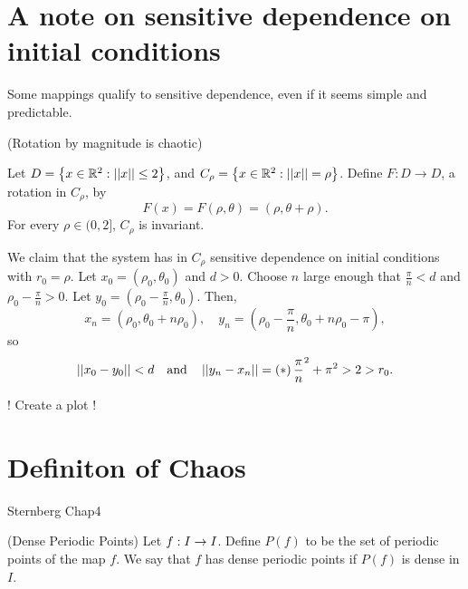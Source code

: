 \documentclass[12pt]{book}
\begin{document}
\section{A note on sensitive dependence on initial conditions}
Some mappings qualify to sensitive dependence, even if it seems simple and predictable.

\begin{proposition}
  (Rotation by magnitude is chaotic)

  Let $D = \left \{ x \in \mathbb{R}^2: \left|\left| x \right|\right| \leq 2 \right \}$, and $C_\rho = \left \{ x \in \mathbb{R}^2: \left|\left| x \right|\right| = \rho \right \}$.
  Define $F: D \to D$, a rotation in $C_\rho$, by
  \begin{equation*}
    F(x) = F(\rho, \theta) = (\rho, \theta + \rho).
  \end{equation*}
  For every $\rho \in (0,2]$, $C_\rho$ is invariant.

  We claim that the system has in $C_\rho$ sensitive dependence on initial conditions with $r_0 = \rho$.
  Let $x_0 = (\rho_0, \theta_0)$ and $d > 0$.
  Choose $n$ large enough that $\frac{\pi}{n} < d$ and $\rho_0 - \frac{\pi}{n} > 0$.
  Let $y_0 = (\rho_0 - \frac{\pi}{n}, \theta_0)$.
  Then,
  \begin{equation*}
    x_n = (\rho_0, \theta_0 + n\rho_0),\quad
    y_n = (\rho_0 - \frac{\pi}{n}, \theta_0 + n\rho_0 - \pi),
  \end{equation*}
  so
  \begin{equation*}
    \left|\left| x_0 - y_0 \right|\right| < d \quad \mbox{and} \quad \left|\left| y_n - x_n \right|\right| = \left ( * \right ){\frac{\pi}{n}}^2 + \pi^2 > 2 > r_0.
  \end{equation*}
\end{proposition}
 
! Create a plot !




\section{Definiton of Chaos}
Sternberg Chap4
\begin{definition}
  (Dense Periodic Points) Let $f: I \rightarrow I$. Define $P(f)$ to be the set of periodic points
  of the map $f$. We say that $f$ has dense periodic points if $P(f)$ is
  dense in $I$.
\end{definition}
\end{document}
